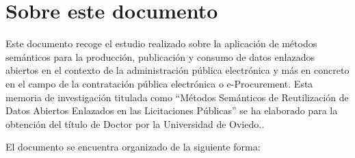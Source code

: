 \chapter*{Sobre este documento}

Este documento recoge el estudio realizado sobre la aplicación
de métodos semánticos para la producción, publicación y consumo 
de datos enlazados abiertos en el contexto de la administración pública
electrónica y más en concreto en el campo de la contratación pública
electrónica o e-Procurement. Esta memoria de investigación titulada como
``Métodos Semánticos de Reutilización de Datos Abiertos Enlazados en las
Licitaciones Públicas'' se ha elaborado para la obtención del título
de Doctor por la Universidad de Oviedo..

El documento se encuentra organizado de la siguiente forma:
